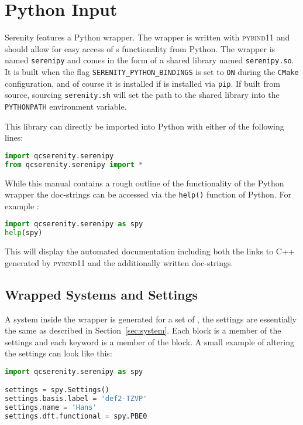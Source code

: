 \chapter{Python Input}
\label{sec:python}
Serenity features a Python wrapper.
The wrapper is written with \textsc{pybind11}\cite{pybind11} and should allow for easy access of \serenity s functionality from Python.
The wrapper is named \texttt{serenipy} and comes in the form of a shared library named \texttt{serenipy.so}. It is built when the flag \texttt{SERENITY\_PYTHON\_BINDINGS} is set to \texttt{ON} during the \texttt{CMake} configuration, and of course it is installed if \serenity is installed via \texttt{pip}. If built from source, sourcing \texttt{serenity.sh} will set the path to the shared library into the \texttt{PYTHONPATH} environment variable.

This library can directly be imported into Python with either of the following lines:
\begin{lstlisting}[language=Python]
import qcserenity.serenipy
from qcserenity.serenipy import *
\end{lstlisting}
While this manual contains a rough outline of the functionality of the Python wrapper the doc-strings can be accessed via the
\texttt{help()} function of Python. For example :
\begin{lstlisting}[language=Python]
import qcserenity.serenipy as spy
help(spy)
\end{lstlisting}
This will display the automated documentation including both the links to C++ generated by \textsc{pybind11} and the additionally written doc-strings.
\section{Wrapped Systems and Settings}
A system inside the wrapper is generated for a set of ,
the settings are essentially the same as described in Section~\ref{sec:system}.
Each block is a member of the settings and each keyword is a member of the block.
A small example of altering the settings can look like this:
\begin{lstlisting}[language=Python]
import qcserenity.serenipy as spy

settings = spy.Settings()
settings.basis.label = 'def2-TZVP'
settings.name = 'Hans'
settings.dft.functional = spy.PBE0
\end{lstlisting}

